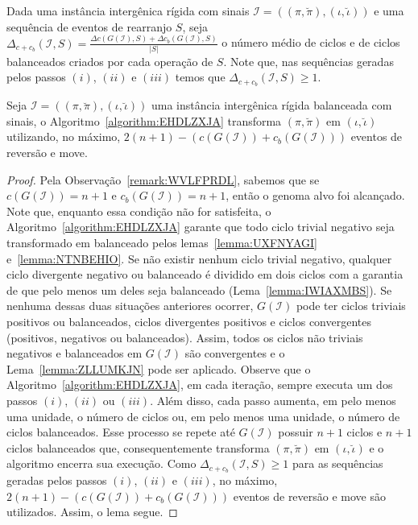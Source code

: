 

Dada uma instância intergênica rígida com sinais $\mathcal{I}=((\pi,\breve\pi),(\iota,\breve\iota))$ e uma sequência de eventos de rearranjo $S$, seja $\Delta_{c+c_b} (\mathcal{I},S) = \frac{\Delta c(G(\mathcal{I}),S) + \Delta c_b(G(\mathcal{I}),S)}{|S|}$ o número médio de ciclos e de ciclos balanceados criados por cada operação de $S$. Note que, nas sequências geradas pelos passos $(i)$, $(ii)$ e $(iii)$ temos que $\Delta_{c+c_b}(\mathcal{I},S) \ge 1$.

\begin{lemma}\label{lemma:APHTXLZC}
Seja $\mathcal{I} = ((\pi,\breve\pi),(\iota,\breve\iota))$ uma instância intergênica rígida balanceada com sinais, o Algoritmo~\ref{algorithm:EHDLZXJA} transforma $(\pi,\breve\pi)$ em $(\iota,\breve\iota)$ utilizando, no máximo, $2(n + 1) - (c(G(\mathcal{I})) + c_b(G(\mathcal{I})))$ eventos de reversão e move.
\end{lemma}
\begin{proof}
Pela Observação~\ref{remark:WVLFPRDL}, sabemos que se $c(G(\mathcal{I})) = {n + 1}$ e $c_b(G(\mathcal{I})) = {n + 1}$, então o genoma alvo foi alcançado. Note que, enquanto essa condição não for satisfeita, o Algoritmo~\ref{algorithm:EHDLZXJA} garante que todo ciclo trivial negativo seja transformado em balanceado pelos lemas~\ref{lemma:UXFNYAGI} e~\ref{lemma:NTNBEHIO}. Se não existir nenhum ciclo trivial negativo, qualquer ciclo divergente negativo ou balanceado é dividido em dois ciclos com a garantia de que pelo menos um deles seja balanceado (Lema~\ref{lemma:IWIAXMBS}). Se nenhuma dessas duas situações anteriores ocorrer, $G(\mathcal{I})$ pode ter ciclos triviais positivos ou balanceados, ciclos divergentes positivos e ciclos convergentes (positivos, negativos ou balanceados). Assim, todos os ciclos não triviais negativos e balanceados em $G(\mathcal{I})$ são convergentes e o Lema~\ref{lemma:ZLLUMKJN} pode ser aplicado. Observe que o Algoritmo~\ref{algorithm:EHDLZXJA}, em cada iteração, sempre executa um dos passos $(i)$, $(ii)$ ou $(iii)$. Além disso, cada passo aumenta, em pelo menos uma unidade, o número de ciclos ou, em pelo menos uma unidade, o número de ciclos balanceados. Esse processo se repete até $G(\mathcal{I})$ possuir ${n+1}$ ciclos e ${n+1}$ ciclos balanceados que, consequentemente transforma $(\pi, \breve\pi)$ em $(\iota,\breve\iota)$ e o algoritmo encerra sua execução.  Como $\Delta_{c+c_b}(\mathcal{I},S) \ge 1$ para as sequências geradas pelos passos $(i)$, $(ii)$ e $(iii)$, no máximo, $2(n + 1) - (c(G(\mathcal{I})) + c_b(G(\mathcal{I})))$ eventos de reversão e move são utilizados. Assim, o lema segue.
\end{proof}

